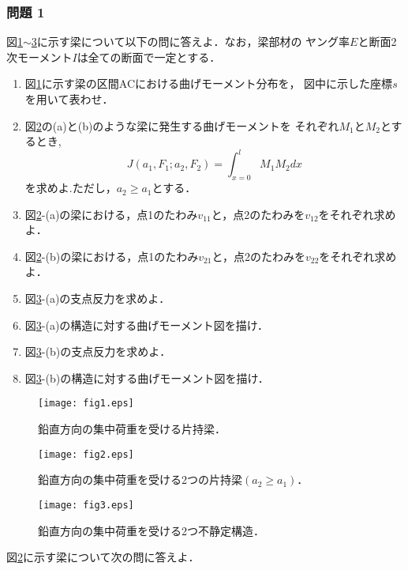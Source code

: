 \documentclass[10pt,a4j]{jarticle}
\begin{document}
\subsubsection*{問題 1}
図\ref{fig:fig1}$\sim$\ref{fig:fig3}に示す梁について以下の問に答えよ．なお，梁部材の
ヤング率$E$と断面2次モーメント$I$は全ての断面で一定とする．
\begin{enumerate}
\item
	図\ref{fig:fig1}に示す梁の区間ACにおける曲げモーメント分布を，
	図中に示した座標$s$を用いて表わせ．
\item
	図\ref{fig:fig2}の(a)と(b)のような梁に発生する曲げモーメントを
	それぞれ$M_1$と$M_2$とするとき,
	\begin{equation}
		J(a_1,F_1;a_2,F_2)=\int_{x=0}^{l}M_1M_2 dx
	\end{equation}
	を求めよ.ただし，$a_2\geq a_1$とする．
\item
	図\ref{fig:fig2}-(a)の梁における，点1のたわみ$v_{11}$と，点2のたわみを$v_{12}$をそれぞれ求めよ．
\item
	図\ref{fig:fig2}-(b)の梁における，点1のたわみ$v_{21}$と，点2のたわみを$v_{22}$をそれぞれ求めよ．
\item
	図\ref{fig:fig3}-(a)の支点反力を求めよ．
\item
	図\ref{fig:fig3}-(a)の構造に対する曲げモーメント図を描け．
\item
	図\ref{fig:fig3}-(b)の支点反力を求めよ．
\item
	図\ref{fig:fig3}-(b)の構造に対する曲げモーメント図を描け．
\end{enumerate}
\begin{figure}[h]
	\begin{center}
	\texttt{[image: fig1.eps]} 
	\end{center}
	\caption{鉛直方向の集中荷重を受ける片持梁．} 
	\label{fig:fig1}
\end{figure}
\begin{figure}[h]
	\begin{center}
	\texttt{[image: fig2.eps]} 
	\end{center}
	\caption{鉛直方向の集中荷重を受ける2つの片持梁$(a_2\geq a_1)$．} 
	\label{fig:fig2}
\end{figure}
\begin{figure}[h]
	\begin{center}
	\texttt{[image: fig3.eps]} 
	\end{center}
	\caption{鉛直方向の集中荷重を受ける2つ不静定構造．} 
	\label{fig:fig3}
\end{figure}
図\ref{fig:fig2}に示す梁について次の問に答えよ．
\end{document}

